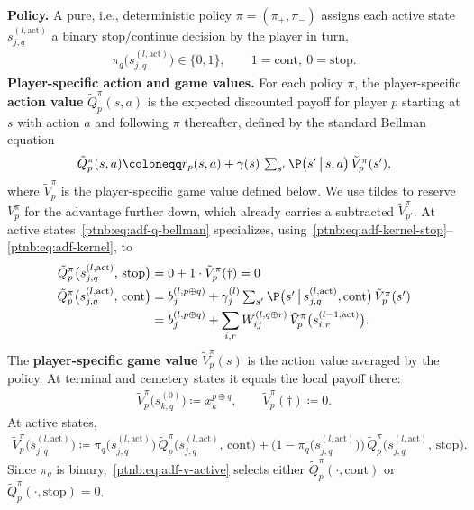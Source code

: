 \begin{definition}
\textbf{Policy.} A pure, i.e., deterministic policy $\pi = (\pi_+, \pi_-)$ assigns each active
state $s_{j,q}^{(l, \mathrm{act})}$ a binary stop/continue decision by the player in turn,
\begin{align}
    \pi_q\bigl(s_{j,q}^{(l, \mathrm{act})}\bigr) \in \{0, 1\},
    \qquad
    1 = \mathrm{cont},\ 0 = \mathrm{stop}.
\end{align}
\textbf{Player-specific action and game values.} For each policy $\pi$, the player-specific
\textbf{action value} $\tilde{Q}_p^\pi(s, a)$ is the expected discounted payoff for player $p$
starting at $s$ with action $a$ and following $\pi$ thereafter, defined by the standard Bellman
equation
\begin{align}\label{ptnb:eq:adf-q-bellman}
    \tilde{Q}_p^\pi(s, a) \coloneqq r_p(s, a) + \gamma(s)\, \textstyle\sum_{s'} \P\bigl(s' \,\big|\, s,
    a\bigr)\, \tilde{V}_p^\pi(s'),
\end{align}
where $\tilde{V}_p^\pi$ is the player-specific game value defined below. We use tildes to reserve
$V_p^\pi$ for the advantage further down, which already carries a subtracted $\tilde{V}_{p'}^\pi$.
At active states~\eqref{ptnb:eq:adf-q-bellman} specializes,
using~\eqref{ptnb:eq:adf-kernel-stop}--\eqref{ptnb:eq:adf-kernel}, to
\begin{align}\label{ptnb:eq:adf-q-stop}
    \tilde{Q}_p^\pi\bigl(s_{j,q}^{(l, \mathrm{act})},\, \mathrm{stop}\bigr) &= 0 + 1 \cdot
    \tilde{V}_p^\pi(\dagger) = 0 \\ \label{ptnb:eq:adf-q-cont}
    \tilde{Q}_p^\pi\bigl(s_{j,q}^{(l, \mathrm{act})},\, \mathrm{cont}\bigr)
    &= b_j^{(l, p \oplus q)} + \gamma_j^{(l)} \textstyle\sum_{s'} \P\bigl(s' \,\big|\, s_{j,q}^{(l,
    \mathrm{act})}, \mathrm{cont}\bigr)\, \tilde{V}_p^\pi(s') \\
    &= b_j^{(l, p \oplus q)} + \sum_{i,r} W_{ij}^{(l, q \oplus r)}\,
    \tilde{V}_p^\pi\bigl(s_{i,r}^{(l-1, \mathrm{act})}\bigr).
\end{align}
The \textbf{player-specific game value} $\tilde{V}_p^\pi(s)$ is the action value averaged by the
policy. At terminal and cemetery states it equals the local payoff there:
\begin{align}\label{ptnb:eq:adf-v-terminal}
    \tilde{V}_p^\pi\bigl(s_{k,q}^{(0)}\bigr) \coloneqq x_k^{p \oplus q},
    \qquad
    \tilde{V}_p^\pi(\dagger) \coloneqq 0.
\end{align}
At active states,
\begin{align}\label{ptnb:eq:adf-v-active}
    \tilde{V}_p^\pi\bigl(s_{j,q}^{(l, \mathrm{act})}\bigr) \coloneqq \pi_q\bigl(s_{j,q}^{(l,
    \mathrm{act})}\bigr)\, \tilde{Q}_p^\pi\bigl(s_{j,q}^{(l, \mathrm{act})},\, \mathrm{cont}\bigr) +
    \bigl(1 - \pi_q\bigl(s_{j,q}^{(l, \mathrm{act})}\bigr)\bigr)\, \tilde{Q}_p^\pi\bigl(s_{j,q}^{(l,
    \mathrm{act})},\, \mathrm{stop}\bigr).
\end{align}
Since $\pi_q$ is binary,~\eqref{ptnb:eq:adf-v-active} selects either $\tilde{Q}_p^\pi(\cdot,
    \mathrm{cont})$ or $\tilde{Q}_p^\pi(\cdot, \mathrm{stop}) = 0$.


\end{definition}
